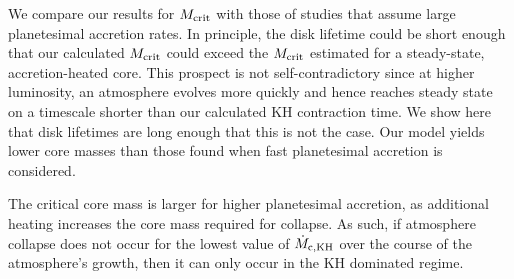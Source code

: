 We compare our results for $M_{\rm crit}$ with those of studies that assume large planetesimal accretion rates.  In principle, the disk lifetime could be short enough that our calculated $M_{\rm crit}$ 
could exceed the $M_{\rm crit}$ estimated for a steady-state, accretion-heated core.  This prospect is not self-contradictory since at higher luminosity, an atmosphere evolves more quickly and hence reaches steady state on a timescale shorter than our calculated KH contraction time.   
We show here that disk lifetimes are long enough that this is not the case.  Our model yields lower core masses than those found when fast planetesimal accretion is considered. 

The critical core mass is larger for higher planetesimal accretion, as additional heating increases the core mass required for collapse. As such, if atmosphere collapse does not occur for the lowest value of $\dot{M}_{\rm c, KH}$ over the course of the atmosphere's growth, then it can only occur in the KH dominated regime. %





